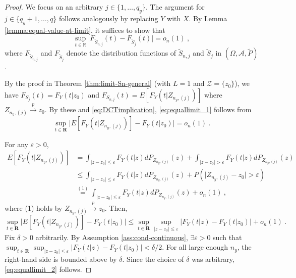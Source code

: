 \documentclass[11pt]{article}
\numberwithin{equation}{section}
\begin{document}
\begin{proof}
We focus on an arbitrary \( j \in \{1, \dots, q_{y}\} \). The argument for \( j \in \{q_{y} + 1, \dots, q\} \) follows analogously by replacing \( Y \) with \( X \). By Lemma \ref{lemma:equal-value-at-limit}, it suffices to show that  
\begin{equation}\label{eq:equallimit_1}
    \sup_{t \in \mathbb{R}} \big| F_{\tilde{S}_{n,j}}(t) - F_{\tilde{S}_{j}}(t) \big| = o_{n}(1)~, 
\end{equation}  
where \( F_{\tilde{S}_{n,j}} \) and \( F_{\tilde{S}_{j}} \) denote the distribution functions of \( \tilde{S}_{n,j} \) and \( \tilde{S}_{j} \) in \( (\Omega, \mathcal{A}, \tilde{P}) \).

By the proof in Theorem \ref{thm:limit-Sn-general} (with $L=1$ and $\mathcal{Z}=\{z_{0}\}$), we have $ F_{S_{j}}(t)=F_{Y}(t|z_{0})$ and $ F_{S_{n,j}}(t)=E[F_{Y}(t|Z_{n_{y},(j)})]$ where $ Z_{n_{y},(j)}\overset{p}{\to }z_{0}$. By these and \eqref{eq:DCTimplication}, \eqref{eq:equallimit_1} follows from
\begin{equation}
\sup_{t\in \mathbf{R}}\vert E[F_{Y}(t|Z_{n_{y},(j)})]-F_{Y}(t|z_{0})\vert =o_{n}(1)~. \label{eq:equallimit_2}
\end{equation}

For any $\varepsilon >0$,
\begin{align*}
E[F_{Y}(t|Z_{n_{y},(j)})] &=\int_{\vert z-z_{0}\vert \leq \varepsilon }F_{Y}(t|z)dP_{Z_{n_{y},(j)}}( z) +\int_{\vert z-z_{0}\vert >\varepsilon }F_{Y}(t|z)dP_{Z_{n_{y},(j)}}( z) \\
&\leq \int_{\vert z-z_{0}\vert \leq \varepsilon }F_{Y}(t|z)dP_{Z_{n_{y},(j)}}( z) +P( \vert Z_{n_{y},(j)}-z_{0}\vert >\varepsilon ) \\
&\overset{(1)}{=} \int_{\vert z-z_{0}\vert \leq \varepsilon }F_{Y}(t|z)dP_{Z_{n_{y},(j)}}( z) +o_{n}(1)~,
\end{align*}
where (1) holds by $Z_{n_{y},(j)}\overset{p}{\to }z_{0}$. Then,
\begin{equation*}
\sup_{t\in \mathbf{R}}\vert E[F_{Y}(t|Z_{n_{y},(j)})]-F_{Y}(t|z_{0})\vert \leq \sup_{t\in \mathbf{R} }\sup_{\vert z-z_{0}\vert \leq \varepsilon }\vert F_{Y}(t|z)-F_{Y}(t|z_{0})\vert +o_{n}(1)~.
\end{equation*}
Fix $\delta >0$ arbitrarily. By Assumption \ref{ass:cond-continuous}, $\exists \varepsilon >0$ such that $ \sup_{t\in \mathbf{R}}\sup_{\vert z-z_{0}\vert \leq \varepsilon }\vert F_{Y}(t|z)-F_{Y}(t|z_{0})\vert <\delta /2$. For all large enough $n_y$, the right-hand side is bounded above by $\delta $. Since the choice of $\delta $ was arbitrary, \eqref{eq:equallimit_2} follows.
\end{proof}
\end{document}
